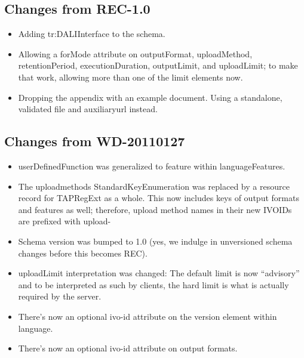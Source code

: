 \documentclass{ivoa}
\begin{document}
\label{changes}

\subsection{Changes from REC-1.0}

\begin{itemize}
\item Adding tr:DALIInterface to the schema.
\item Allowing a forMode attribute on outputFormat, uploadMethod,
retentionPeriod, executionDuration, outputLimit, and uploadLimit; to
make that work, allowing more than one of the limit elements now.
\item Dropping the appendix with an example document.  Using a
standalone, validated file and auxiliaryurl instead.
\end{itemize}

\subsection{Changes from WD-20110127}

\label{changes-20110127}

\begin{itemize}

\item userDefinedFunction was generalized to feature within languageFeatures.{}

\item The uploadmethods StandardKeyEnumeration was replaced by a
resource record for TAPRegExt as a whole.  This now includes keys of output
formats and features as well; therefore, upload method names in their new
IVOIDs are prefixed with upload-{}

\item Schema version was bumped to 1.0 (yes, we indulge in unversioned
schema changes before this becomes REC).{}

\item uploadLimit interpretation was changed: The default limit is now
``advisory'' and to be interpreted as such by clients, the hard limit
is what is actually required by the server.{}

\item There's now an optional ivo-id attribute on the version element
within language.{}

\item There's now an optional ivo-id attribute on output formats.{}

\end{itemize}
\end{document}
